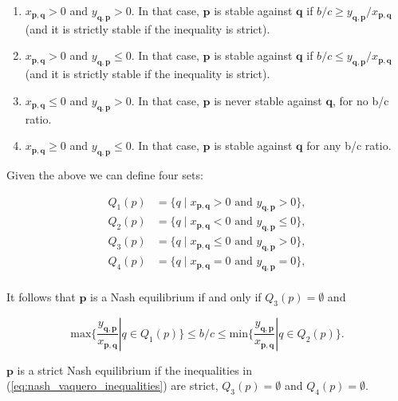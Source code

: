 \documentclass{article}
\theoremstyle{definition}
\begin{document}
\begin{enumerate}
  \item \(x_{\mathbf{p}, \mathbf{q}} > 0 \) and \(y_{\mathbf{q}, \mathbf{p}} > 0\). In that case, \(\mathbf{p}\) is stable
  against \(\mathbf{q}\) if \(b/c \geq y_{\mathbf{q}, \mathbf{p}}/x_{\mathbf{p}, \mathbf{q}}\) (and it is strictly stable if the inequality is
  strict).
  \item \(x_{\mathbf{p}, \mathbf{q}} > 0 \) and \(y_{\mathbf{q}, \mathbf{p}} \leq 0\). In that case, \(\mathbf{p}\) is stable
  against \(\mathbf{q}\) if \(b/c \leq y_{\mathbf{q}, \mathbf{p}}/x_{\mathbf{p}, \mathbf{q}}\) (and it is strictly stable if the inequality is
  strict).
  \item \(x_{\mathbf{p}, \mathbf{q}} \leq 0 \) and \(y_{\mathbf{q}, \mathbf{p}} > 0\). In that case,
  \(\mathbf{p}\) is never stable against \(\mathbf{q}\), for no b/c ratio.
  \item  \(x_{\mathbf{p}, \mathbf{q}} \geq 0 \) and \(y_{\mathbf{q}, \mathbf{p}} \leq 0\). In that case, \(\mathbf{p}\) is stable against \(\mathbf{q}\) for any b/c ratio.
\end{enumerate}

Given the above we can define four sets:

\begin{align}
  Q_1(p) & = \{q \; | \; x_{\mathbf{p}, \mathbf{q}} > 0 \text{ and } y_{\mathbf{q}, \mathbf{p}} > 0 \}, \\
  Q_2(p) & = \{q \; | \; x_{\mathbf{p}, \mathbf{q}} < 0 \text{ and } y_{\mathbf{q}, \mathbf{p}} \leq 0 \}, \\
  Q_3(p) & = \{q \; | \; x_{\mathbf{p}, \mathbf{q}} \leq 0 \text{ and } y_{\mathbf{q}, \mathbf{p}} > 0\}, \\
  Q_4(p) & = \{q \; | \; x_{\mathbf{p}, \mathbf{q}} = 0  \text{ and } y_{\mathbf{q}, \mathbf{p}} = 0 \}, \\
\end{align}

It follows that \(\mathbf{p}\) is a Nash equilibrium if and only if \(Q_3(p) = \emptyset\)
and

\begin{equation}\label{eq:nash_vaquero_inequalities}
  \text{max}\{ \frac{y_{\mathbf{q}, \mathbf{p}}}{x_{\mathbf{p}, \mathbf{q}}} | q \in Q_1(p) \} \leq b / c  \leq \text{min}\{\frac{y_{\mathbf{q}, \mathbf{p}}}{x_{\mathbf{p}, \mathbf{q}}} | q \in Q_2(p) \}.
\end{equation}

\(\mathbf{p}\) is a strict Nash equilibrium if the inequalities in
(\ref{eq:nash_vaquero_inequalities}) are strict, \(Q_3(p) = \emptyset\) and
\(Q_4(p) = \emptyset\).
\end{document}
